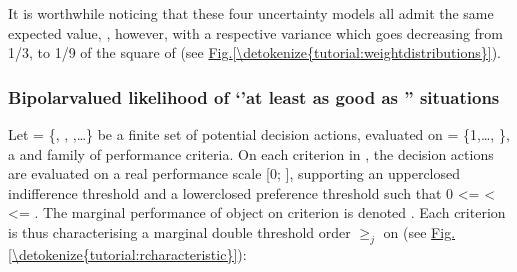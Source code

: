 \documentclass[a4paper,10pt,english]{sphinxhowto}
\begin{document}
It is worthwhile noticing that these four uncertainty models all admit the same expected value, , however, with a respective variance which goes decreasing from 1/3, to 1/9 of the square of  (see \hyperref[\detokenize{tutorial:weightdistributions}]{Fig.\@ \ref{\detokenize{tutorial:weightdistributions}}}).


\subsubsection{Bipolar\sphinxhyphen{}valued likelihood of ‘’at least as good as ” situations}
\label{\detokenize{tutorial:bipolar-valued-likelihood-of-at-least-as-good-as-situations}}
Let  = \{, , ,…\} be a finite set of  potential decision actions, evaluated on  = \{1,…, \}, a  and  family of  performance criteria. On each criterion  in , the decision actions are evaluated on a real performance scale {[}0;  {]}, supporting an upper\sphinxhyphen{}closed indifference threshold  and a lower\sphinxhyphen{}closed preference threshold  such that 0 \textless{}=  \textless{}  \textless{}= . The marginal performance of object  on criterion  is denoted . Each criterion  is thus characterising a marginal double threshold order \(\geq_j\) on  (see \hyperref[\detokenize{tutorial:rcharacteristic}]{Fig.\@ \ref{\detokenize{tutorial:rcharacteristic}}}):
\end{document}
